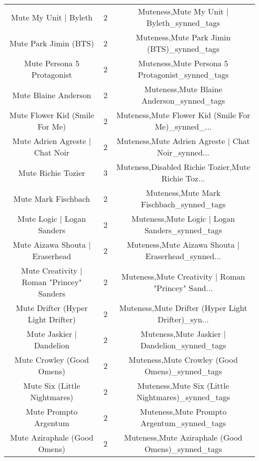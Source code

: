 \begin{table}[h!]
{\begin{tabular}{|c|c|c|}
                             Mute My Unit | Byleth &          2 &         Muteness,Mute My Unit | Byleth\_synned\_tags \\
                             Mute Park Jimin (BTS) &          2 &         Muteness,Mute Park Jimin (BTS)\_synned\_tags \\
                        Mute Persona 5 Protagonist &          2 &    Muteness,Mute Persona 5 Protagonist\_synned\_tags \\
                              Mute Blaine Anderson &          2 &          Muteness,Mute Blaine Anderson\_synned\_tags \\
                    Mute Flower Kid (Smile For Me) &          2 & Muteness,Mute Flower Kid (Smile For Me)\_synned\_... \\
                   Mute Adrien Agreste | Chat Noir &          2 & Muteness,Mute Adrien Agreste | Chat Noir\_synned... \\
                                Mute Richie Tozier &          3 & Muteness,Disabled Richie Tozier,Mute Richie Toz... \\
                               Mute Mark Fischbach &          2 &           Muteness,Mute Mark Fischbach\_synned\_tags \\
                        Mute Logic | Logan Sanders &          2 &    Muteness,Mute Logic | Logan Sanders\_synned\_tags \\
                   Mute Aizawa Shouta | Eraserhead &          2 & Muteness,Mute Aizawa Shouta | Eraserhead\_synned... \\
         Mute Creativity | Roman "Princey" Sanders &          2 & Muteness,Mute Creativity | Roman "Princey" Sand... \\
                Mute Drifter (Hyper Light Drifter) &          2 & Muteness,Mute Drifter (Hyper Light Drifter)\_syn... \\
                          Mute Jaskier | Dandelion &          2 &      Muteness,Mute Jaskier | Dandelion\_synned\_tags \\
                         Mute Crowley (Good Omens) &          2 &     Muteness,Mute Crowley (Good Omens)\_synned\_tags \\
                      Mute Six (Little Nightmares) &          2 &  Muteness,Mute Six (Little Nightmares)\_synned\_tags \\
                             Mute Prompto Argentum &          2 &         Muteness,Mute Prompto Argentum\_synned\_tags \\
                      Mute Aziraphale (Good Omens) &          2 &  Muteness,Mute Aziraphale (Good Omens)\_synned\_tags \\

\end{tabular}}
\end{table}
